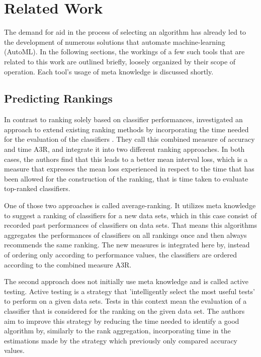 \chapter{Related Work}
\label{sec:related}
The demand for aid in the process of selecting an algorithm has already led to the development of numerous solutions that automate machine-learning (AutoML). In the following sections, the workings of a few such tools that are related to this work are outlined briefly, loosely organized by their scope of operation. Each tool's usage of meta knowledge is discussed shortly.\\ 

\section{Predicting Rankings}
In contrast to ranking solely based on classifier performances, \citeauthor{DBLP:journals/ml/AbdulrahmanBRV18} investigated an approach to extend existing ranking methods by incorporating the time needed for the evaluation of the classifiers \cite{DBLP:journals/ml/AbdulrahmanBRV18}. They call this combined measure of accuracy and time A3R, and integrate it into two different ranking approaches. In both cases, the authors find that this leads to a better mean interval loss, which is a measure that expresses the mean loss experienced in respect to the time that has been allowed for the construction of the ranking, that is time taken to evaluate top-ranked classifiers. 

One of those two approaches is called average-ranking. It utilizes meta knowledge to suggest a ranking of classifiers for a new data sets, which in this case consist of recorded past performances of classifiers on data sets. That means this algorithms aggregates the performances of classifiers on all rankings once and then always recommends the same ranking. The new measures is integrated here by, instead of ordering only according to performance values, the classifiers are ordered according to the combined measure A3R.

The second approach does not initially use meta knowledge and is called active testing. Active testing is a strategy that 'intelligently select the most useful tests' \cite{DBLP:journals/ml/AbdulrahmanBRV18} to perform on a given data sets. Tests in this context mean the evaluation of a classifier that is considered for the ranking on the given data set. The authors aim to improve this strategy by reducing the time needed to identify a good algorithm by, similarly to the rank aggregation, incorporating time in the estimations made by the strategy which previously only compared accuracy values.

